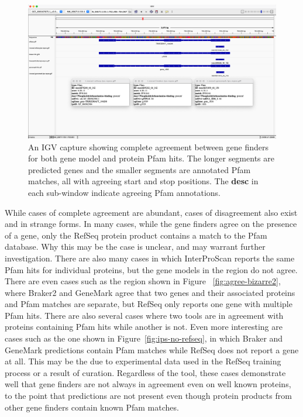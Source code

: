 \begin{figure}[h!]
  \centering
  \includegraphics[width=\textwidth]{figures/igv/ips-basic-agree.png}
  \caption[Agreeing Pfam matches]{An IGV capture showing complete
    agreement between gene finders for both gene model and protein
    Pfam hits. The longer segments are predicted genes and the smaller
    segments are annotated Pfam matches, all with agreeing start and
    stop positions. The \textbf{desc} in each sub-window indicate
    agreeing Pfam annotations.}
  \label{fig:basic-agree}
\end{figure}

While cases of complete agreement are abundant, cases of disagreement
also exist and in strange forms. In many cases, while the gene finders
agree on the presence of a gene, only the RefSeq protein product
contains a match to the Pfam database. Why this may be the case is
unclear, and may warrant further investigation. There are also many
cases in which InterProScan reports the same Pfam hits for individual
proteins, but the gene models in the region do not agree. There are
even cases such as the region shown in Figure
~\ref{fig:agree-bizarre2}, where Braker2 and GeneMark agree that two
genes and their associated proteins and Pfam matches are separate, but
RefSeq only reports one gene with multiple Pfam hits. There are also
several cases where two tools are in agreement with proteins
containing Pfam hits while another is not. Even more interesting are
cases such as the one shown in Figure~\ref{fig:ips-no-refseq}, in
which Braker and GeneMark predictions contain Pfam matches while
RefSeq does not report a gene at all. This may be the due to
experimental data used in the RefSeq training process or a result of
curation. Regardless of the tool, these cases demonstrate well that
gene finders are not always in agreement even on well known proteins,
to the point that predictions are not present even though protein
products from other gene finders contain known Pfam matches.


